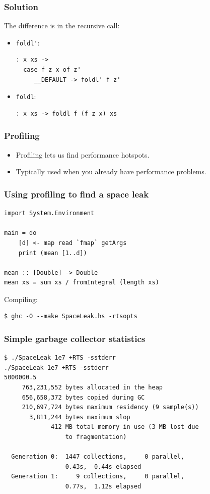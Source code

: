\documentclass{beamer}
\begin{document}
\begin{frame}[fragile]
  \frametitle{Solution}

  The difference is in the recursive call:
  \begin{itemize}
  \item \lstinline!foldl'!:
  \begin{verbatim}
: x xs ->
  case f z x of z'
     __DEFAULT -> foldl' f z'
  \end{verbatim}
  \item \lstinline!foldl!:
  \begin{verbatim}
: x xs -> foldl f (f z x) xs
  \end{verbatim}
  \end{itemize}
\end{frame}



\begin{frame}
  \frametitle{Profiling}

  \begin{itemize}
  \item Profiling lets us find performance hotspots.
  \item Typically used when you already have performance problems.
  \end{itemize}
\end{frame}

\begin{frame}[fragile]
  \frametitle{Using profiling to find a space leak}

  \begin{lstlisting}
import System.Environment

main = do
    [d] <- map read `fmap` getArgs
    print (mean [1..d])

mean :: [Double] -> Double
mean xs = sum xs / fromIntegral (length xs)
  \end{lstlisting}

  Compiling:
  \begin{verbatim}
$ ghc -O --make SpaceLeak.hs -rtsopts
  \end{verbatim}
\end{frame}

\begin{frame}[fragile]
  \frametitle{Simple garbage collector statistics}

  \begin{verbatim}
$ ./SpaceLeak 1e7 +RTS -sstderr
./SpaceLeak 1e7 +RTS -sstderr 
5000000.5
     763,231,552 bytes allocated in the heap
     656,658,372 bytes copied during GC
     210,697,724 bytes maximum residency (9 sample(s))
       3,811,244 bytes maximum slop
             412 MB total memory in use (3 MB lost due
                 to fragmentation)

  Generation 0:  1447 collections,     0 parallel,
                 0.43s,  0.44s elapsed
  Generation 1:     9 collections,     0 parallel,
                 0.77s,  1.12s elapsed
  \end{verbatim}
\end{frame}
\end{document}
